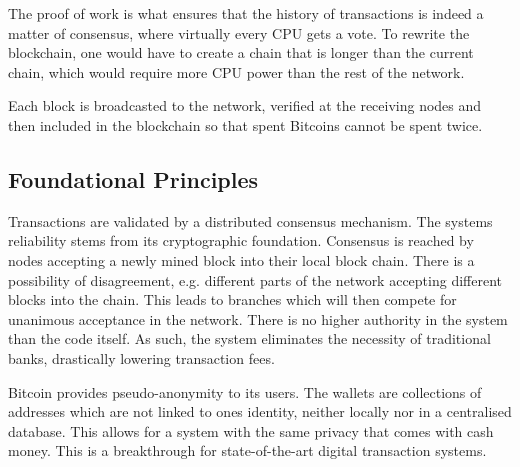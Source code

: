 \documentclass[12pt,journal,compsoc]{IEEEtran}
\begin{document}
The proof of work is what ensures that the history of transactions is indeed a matter of consensus,
where virtually every CPU gets a vote.
To rewrite the blockchain, one would have to create a chain that is longer than the current chain,
which would require more CPU power than the rest of the network.

Each block is broadcasted to the network, verified at the receiving nodes and then included in the
blockchain so that spent Bitcoins cannot be spent twice.

\subsection{Foundational Principles}

Transactions are validated by a distributed consensus mechanism. The systems reliability stems from its 
cryptographic foundation. Consensus is reached by nodes accepting a newly mined block into their local block 
chain. There is a possibility of disagreement, e.g. different parts of the network accepting different blocks into the 
chain. This leads to branches which will then compete for unanimous acceptance in the network. There is no
higher authority in the system than the code itself. As such, the system eliminates the necessity of traditional 
banks, drastically lowering transaction fees.

Bitcoin provides pseudo-anonymity\cite{martins2011introduction} to its users. The wallets are collections
of addresses which are not linked to ones identity, neither locally nor in a centralised database. This allows for a 
system with the same privacy that comes with cash money. This is a breakthrough for state-of-the-art 
digital transaction systems.
\end{document}
